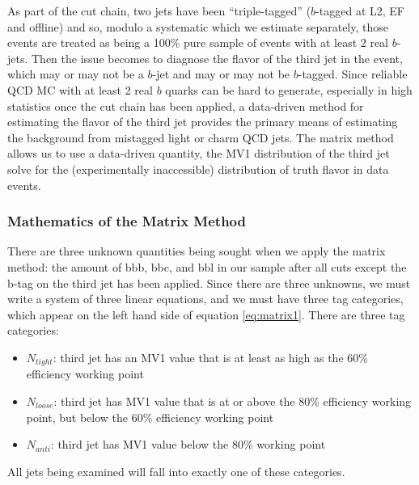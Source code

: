 As part of the cut chain, two jets have been ``triple-tagged'' ($b$-tagged
at L2, EF and offline) and so, modulo a systematic which we estimate separately, 
those events are treated as being a 100\% pure sample of events with at least 2 real $b$-jets.
Then the issue becomes to diagnose the flavor of the third jet in the event,
which may or may not be a $b$-jet and may or may not be $b$-tagged.  Since
reliable QCD MC with at least 2 real $b$ quarks can be hard to generate, especially
in high statistics once the cut chain has been applied, a data-driven method for
estimating the flavor of the third jet provides the primary means of estimating
the background from mistagged light or charm QCD jets.  The matrix method allows
us to use a data-driven quantity, the MV1 distribution of the third jet
solve for the (experimentally inaccessible) distribution of truth flavor in data events.

\subsubsection{Mathematics of the Matrix Method}
There are three unknown quantities being sought when we apply the matrix method: the amount of bbb, bbc, and bbl in our sample after all cuts except the b-tag on the third jet has been applied.   Since there are three unknowns, we must write a system of three linear equations, and we must have three tag categories, which appear on the left hand side of equation \ref{eq:matrix1}.  There are three tag categories:
	
	\begin{itemize}
		\item $N_{tight}$: third jet has an MV1 value that is at least as high as the 60\% efficiency working point
		\item $N_{loose}$: third jet has MV1 value that is at or above the 80\% efficiency working point, but below the 60\% efficiency working point
		\item $N_{anti}$: third jet has MV1 value below the 80\% working point
	\end{itemize}

All jets being examined will fall into exactly one of these categories.

